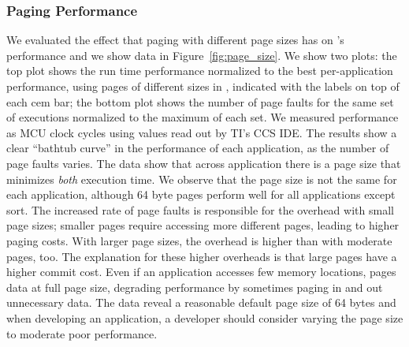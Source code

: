 

\subsubsection{\sys Paging Performance}
\label{sec:results_memory_management}

We evaluated the effect that paging with different page sizes has on \sys's
performance and we show data in Figure~\ref{fig:page_size}. We show two plots:
the top plot shows the run time performance normalized to the best
per-application performance, using pages of different sizes in \sys, indicated
with the labels on top of each cem bar; the bottom plot shows the number of
page faults for the same set of executions normalized to the maximum of each
set.
%
We measured performance as MCU clock cycles using values read out by TI's CCS
IDE. 
%
The results show a clear ``bathtub curve'' in the performance of each
application, as the number of page faults varies. The data show that across
application there is a page size that minimizes \emph{both} execution time.  We
observe that the page size is not the same for each application, although 64
byte pages perform well for all applications except sort. The increased rate of
page faults is responsible for the overhead with small page sizes; smaller
pages require accessing more different pages, leading to higher paging costs.
With larger page sizes, the overhead is higher than with moderate pages, too.
The explanation for these higher overheads is that large pages have a higher
commit cost. Even if an application accesses few memory locations, \sys pages
data at full page size, degrading performance by sometimes paging in and out
unnecessary data.  The data reveal a reasonable default page size of 64 bytes
and when developing an application, a developer should consider varying the
page size to moderate poor performance.


